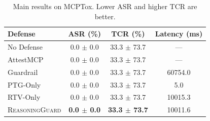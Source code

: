 \begin{table}[t]
\centering
\small
\begin{tabular}{lccc}
\toprule
Defense & ASR (\%) & TCR (\%) & Latency (ms) \\
\midrule
No Defense & 0.0 $\pm$ 0.0 & 33.3 $\pm$ 73.7 & --- \\
AttestMCP & 0.0 $\pm$ 0.0 & 33.3 $\pm$ 73.7 & --- \\
Guardrail & 0.0 $\pm$ 0.0 & 33.3 $\pm$ 73.7 & 60754.0 \\
PTG-Only & 0.0 $\pm$ 0.0 & 33.3 $\pm$ 73.7 & 5.0 \\
RTV-Only & 0.0 $\pm$ 0.0 & 33.3 $\pm$ 73.7 & 10015.3 \\
\textsc{ReasoningGuard} & \textbf{0.0 $\pm$ 0.0} & \textbf{33.3 $\pm$ 73.7} & 10011.6 \\
\bottomrule
\end{tabular}
\caption{Main results on MCPTox. Lower ASR and higher TCR are better.}
\label{tab:main}
\end{table}
